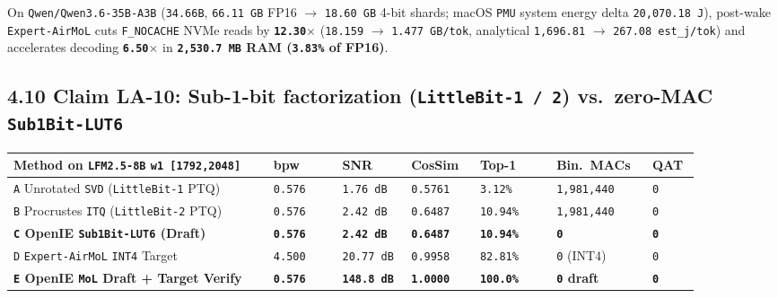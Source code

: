 \documentclass[10pt]{article}
\begin{document}
On \texttt{Qwen/Qwen3.6-35B-A3B} (\texttt{34.66B}, \texttt{66.11 GB} FP16 $\to$ \texttt{18.60 GB} 4-bit shards; macOS \texttt{PMU} system energy delta \texttt{20,070.18 J}), post-wake \texttt{Expert-AirMoL} cuts \texttt{F\_NOCACHE} NVMe reads by \textbf{\texttt{12.30$\times$}} (\texttt{18.159} $\to$ \texttt{1.477 GB/tok}, analytical \texttt{1,696.81} $\to$ \texttt{267.08 est\_j/tok}) and accelerates decoding \textbf{\texttt{6.50$\times$}} in \textbf{\texttt{2,530.7 MB} RAM (\texttt{3.83\%} of FP16)}.

\subsection{4.10 Claim LA-10: Sub-1-bit factorization (\texttt{LittleBit-1 / 2}) vs.\ zero-MAC \texttt{Sub1Bit-LUT6}}\label{claim-la10}

{\footnotesize\setlength{\tabcolsep}{3pt}
\begin{longtable}{@{}L{0.34\linewidth}C{0.09\linewidth}C{0.09\linewidth}C{0.09\linewidth}C{0.10\linewidth}C{0.12\linewidth}C{0.06\linewidth}@{}}
\toprule
\textbf{Method on \texttt{LFM2.5-8B} \texttt{w1 [1792,2048]}} & \textbf{bpw} & \textbf{SNR} & \textbf{CosSim} & \textbf{Top-1} & \textbf{Bin.\ MACs} & \textbf{QAT} \\
\midrule
\endhead
\texttt{A} Unrotated \texttt{SVD} (\texttt{LittleBit-1} PTQ) & \texttt{0.576} & \texttt{1.76 dB} & \texttt{0.5761} & \texttt{3.12\%} & \texttt{1,981,440} & \texttt{0} \\
\texttt{B} Procrustes \texttt{ITQ} (\texttt{LittleBit-2} PTQ) & \texttt{0.576} & \texttt{2.42 dB} & \texttt{0.6487} & \texttt{10.94\%} & \texttt{1,981,440} & \texttt{0} \\
\textbf{\texttt{C} OpenIE \texttt{Sub1Bit-LUT6} (Draft)} & \textbf{\texttt{0.576}} & \textbf{\texttt{2.42 dB}} & \textbf{\texttt{0.6487}} & \textbf{\texttt{10.94\%}} & \textbf{\texttt{0}} & \textbf{\texttt{0}} \\
\texttt{D} \texttt{Expert-AirMoL} \texttt{INT4} Target & \texttt{4.500} & \texttt{20.77 dB} & \texttt{0.9958} & \texttt{82.81\%} & \texttt{0} (INT4) & \texttt{0} \\
\textbf{\texttt{E} OpenIE \texttt{MoL} Draft + Target Verify} & \textbf{\texttt{0.576}} & \textbf{\texttt{148.8 dB}} & \textbf{\texttt{1.0000}} & \textbf{\texttt{100.0\%}} & \textbf{\texttt{0} draft} & \textbf{\texttt{0}} \\
\bottomrule
\end{longtable}
}
\end{document}
